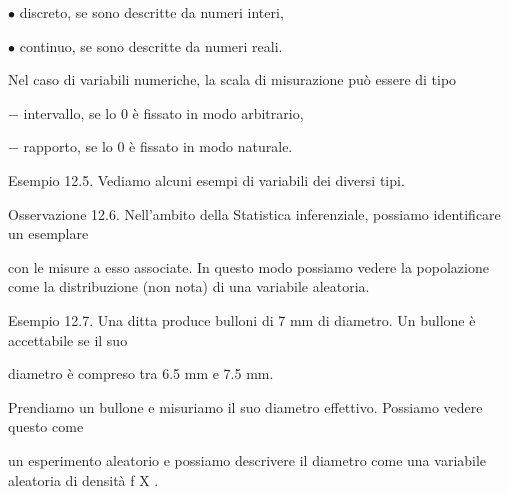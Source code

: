 \documentclass[a4paper,portrait,12pt]{article}
\begin{document}
\begin{flushleft}
$\bullet$ discreto, se sono descritte da numeri interi,
\end{flushleft}


\begin{flushleft}
$\bullet$ continuo, se sono descritte da numeri reali.
\end{flushleft}


\begin{flushleft}
Nel caso di variabili numeriche, la scala di misurazione pu\`{o} essere di tipo
\end{flushleft}


\begin{flushleft}
$-$ intervallo, se lo 0 \`{e} fissato in modo arbitrario,
\end{flushleft}


\begin{flushleft}
$-$ rapporto, se lo 0 \`{e} fissato in modo naturale.
\end{flushleft}


\begin{flushleft}
Esempio 12.5. Vediamo alcuni esempi di variabili dei diversi tipi.
\end{flushleft}


\begin{flushleft}
Osservazione 12.6. Nell'ambito della Statistica inferenziale, possiamo identificare un esemplare
\end{flushleft}


\begin{flushleft}
con le misure a esso associate. In questo modo possiamo vedere la popolazione come la distribuzione (non nota) di una variabile aleatoria.
\end{flushleft}


\begin{flushleft}
Esempio 12.7. Una ditta produce bulloni di 7 mm di diametro. Un bullone \`{e} accettabile se il suo
\end{flushleft}


\begin{flushleft}
diametro \`{e} compreso tra 6.5 mm e 7.5 mm.
\end{flushleft}


\begin{flushleft}
Prendiamo un bullone e misuriamo il suo diametro effettivo. Possiamo vedere questo come
\end{flushleft}


\begin{flushleft}
un esperimento aleatorio e possiamo descrivere il diametro come una variabile aleatoria di densit\`{a} f X .
\end{flushleft}
\end{document}

